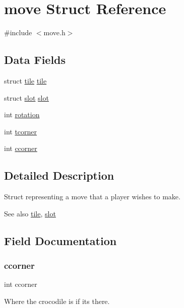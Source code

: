 \hypertarget{structmove}{}\section{move Struct Reference}
\label{structmove}


{\ttfamily \#include $<$move.\+h$>$}

\subsection*{Data Fields}
\begin{DoxyCompactItemize}
\item 
struct \hyperlink{structtile}{tile} \hyperlink{structmove_af4c27cc487c857e8a76e4ed6f38dd351}{tile}
\item 
struct \hyperlink{structslot}{slot} \hyperlink{structmove_a70dfb84f3ffd473f5e7c321b4f7a482a}{slot}
\item 
int \hyperlink{structmove_a2b174cfb62c7f343a1ed1cda3a372e38}{rotation}
\item 
int \hyperlink{structmove_ac450a71debd7858b736e4972e986a399}{tcorner}
\item 
int \hyperlink{structmove_af1a49d13f49e84fa497748870a4e1b67}{ccorner}
\end{DoxyCompactItemize}


\subsection{Detailed Description}
Struct representing a move that a player wishes to make. \begin{DoxySeeAlso}{See also}
\hyperlink{structtile}{tile}, \hyperlink{structslot}{slot} 
\end{DoxySeeAlso}


\subsection{Field Documentation}
\hypertarget{structmove_af1a49d13f49e84fa497748870a4e1b67}{}\label{structmove_af1a49d13f49e84fa497748870a4e1b67} 
\subsubsection{\texorpdfstring{ccorner}{ccorner}}
{\footnotesize\ttfamily int ccorner}

Where the crocodile is if it\textquotesingle{}s there. \hypertarget{structmove_a2b174cfb62c7f343a1ed1cda3a372e38}{}\label{structmove_a2b174cfb62c7f343a1ed1cda3a372e38} 
